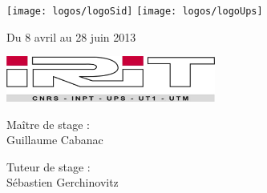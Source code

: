 \begingroup
	\thispagestyle{empty}
	
	\begin{figure}[h!]
		\texttt{[image: logos/logoSid]}\hfill
		\texttt{[image: logos/logoUps]}
	\end{figure}
	
	
	
	\begin{figure}[h!]
		\begin{minipage}[l]{0.6\textwidth}
			\par\normalfont\large\sffamily\selectfont
			Du 8 avril au 28 juin 2013
			\vspace*{5mm}
			
			\includegraphics[height=1.5cm]{img/logos/irit}
		\end{minipage}\hfill
		\begin{minipage}[l]{0.35\textwidth}
			\par\normalfont\large\sffamily\selectfont
			Maître de stage :\\
			Guillaume Cabanac
			\vspace*{5mm}
			
			Tuteur de stage :\\
			Sébastien Gerchinovitz
		\end{minipage}
	\end{figure}
\endgroup